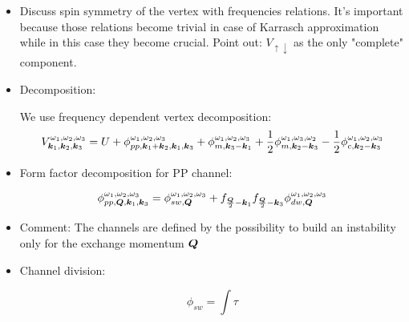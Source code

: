 \begin{itemize}


\item Discuss spin symmetry of the vertex with frequencies relations. It's important because 
those relations become trivial in case of Karrasch approximation while in this case they become crucial. 
Point out: $V_{\uparrow \downarrow}$ as the only "complete" component.

\item Decomposition:

We use frequency dependent vertex decomposition:
\begin{equation}
V^{\omega_1,\omega_2,\omega_3}_{\boldsymbol{k}_1,\boldsymbol{k}_2,\boldsymbol{k}_3}  = U + 
  \phi^{\omega_1,\omega_2,\omega_3}_{pp,\boldsymbol{k}_1+\boldsymbol{k}_2,\boldsymbol{k}_1,\boldsymbol{k}_3} + \phi^{\omega_1,\omega_2,\omega_3}_{m,\boldsymbol{k}_3-\boldsymbol{k}_1} + \frac{1}{2} \phi^{\omega_1,\omega_3,\omega_2}_{m,\boldsymbol{k}_2-\boldsymbol{k}_3}
- \frac{1}{2} \phi^{\omega_1,\omega_2,\omega_3}_{c,\boldsymbol{k}_2-\boldsymbol{k}_3}
\end{equation}

\item Form factor decomposition for PP channel:

\begin{equation}
  \phi^{\omega_1,\omega_2,\omega_3}_{pp,\boldsymbol{Q},\boldsymbol{k}_1,\boldsymbol{k}_3}  =
    \phi_{sw,\boldsymbol{Q}}^{\omega_1,\omega_2,\omega_3} 
    + f_{\frac{\boldsymbol{Q}}{2}-\boldsymbol{k}_1} f_{\frac{\boldsymbol{Q}}{2}-\boldsymbol{k}_3} \phi_{dw,\boldsymbol{Q}}^{\omega_1,\omega_2,\omega_3} 
\end{equation}

\item Comment: The channels are defined by the possibility to build an instability only for the exchange 
   momentum $\boldsymbol{Q}$
   
\item Channel division:

\begin{equation}
\phi_{sw} = \int \tau 
\end{equation}

\end{itemize}

